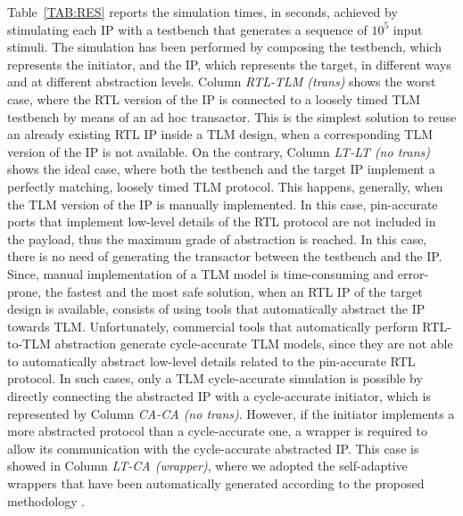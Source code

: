 Table~\ref{TAB:RES} reports the simulation times, in seconds, achieved by stimulating each IP with a testbench that generates a sequence of $10^5$ input stimuli. 
The simulation has been performed by composing the testbench, which represents the initiator, and the IP, which represents the target, in different ways and at different abstraction levels.
Column \textit{RTL-TLM (trans)} shows the worst case, where the RTL version of the IP is connected to a loosely timed TLM testbench by means of an ad hoc transactor. This is the simplest solution to reuse an already existing RTL IP inside a TLM design, when a corresponding TLM version of the IP is not available.
On the contrary, Column \textit{LT-LT (no trans)} shows the ideal case, where both the testbench and the target IP implement a perfectly matching, loosely timed TLM protocol. This happens, generally, when the TLM version of the IP is manually implemented. In this case, pin-accurate ports that implement low-level details of the RTL protocol are not included in the payload, thus  the maximum grade of abstraction is reached. In this case, there is no need of generating the transactor between the testbench and the IP. 
Since, manual implementation of a TLM model is time-consuming and error-prone, the fastest and the most safe solution, when an RTL IP of the target design is available, consists of using tools that automatically abstract the IP towards TLM.
Unfortunately, commercial tools that automatically perform RTL-to-TLM abstraction generate cycle-accurate TLM models, since they are not able to automatically abstract low-level details related to the pin-accurate RTL protocol. In such cases, only a TLM cycle-accurate simulation is possible by directly connecting the abstracted IP with a cycle-accurate initiator, which is represented by Column \textit{CA-CA (no trans)}. However, if the initiator implements a more abstracted protocol than a cycle-accurate one, a wrapper is required to allow its communication with the cycle-accurate abstracted IP. This case is showed in Column \textit{LT-CA  (wrapper)}, where we adopted the self-adaptive wrappers that have been automatically generated according to the proposed methodology .

